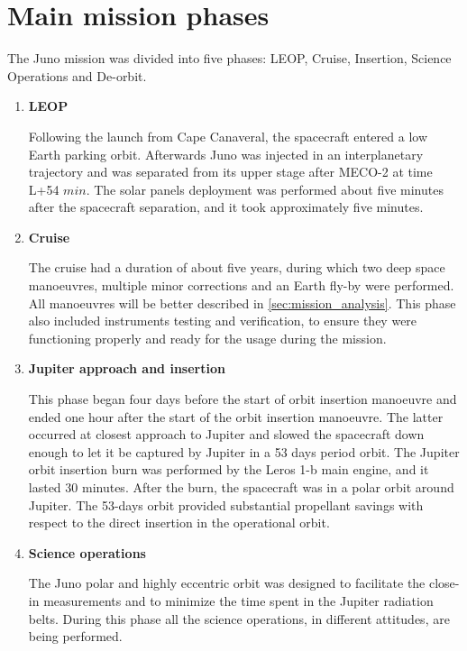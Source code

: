\section{Main mission phases}
\label{sec:phases}

The Juno mission was divided into five phases: LEOP, Cruise, Insertion, Science Operations and De-orbit.
\begin{enumerate}
    \item \textbf{LEOP} 
    
    Following the launch from Cape Canaveral, the spacecraft entered a low Earth parking orbit\cite{Juno_launch}.
     Afterwards Juno was injected in an interplanetary trajectory and was separated from its upper stage after MECO-2 at time L+54 $min$.
    The solar panels deployment was performed about five minutes after the spacecraft separation, and it took approximately five minutes.

    \item \textbf{Cruise}
    
    The cruise had a duration of about five years, during which two deep space manoeuvres, multiple minor corrections and an Earth fly-by were performed.
    All manoeuvres will be better described in \autoref{sec:mission_analysis}. This phase also included instruments testing and verification, to ensure they were functioning properly and ready for the usage during the mission. 

    \item \textbf{Jupiter approach and insertion}
    
    This phase began four days before the start of orbit insertion manoeuvre and ended one hour after the start of the orbit insertion manoeuvre. The latter occurred at closest approach to Jupiter and slowed the spacecraft down enough to let it be captured by Jupiter in a 53 days period orbit.
    The Jupiter orbit insertion burn was performed by the Leros 1-b main engine, and it lasted 30 minutes. After the burn, the spacecraft was in a polar orbit around Jupiter.
    The 53-days orbit provided substantial propellant savings with respect to the direct insertion in the operational orbit.

    \item \textbf{Science operations}
    
    The Juno polar and highly eccentric orbit was designed to facilitate the close-in measurements and to minimize the time spent in the Jupiter radiation belts. During this phase all the science operations, in different attitudes, are being performed.


\end{enumerate}
